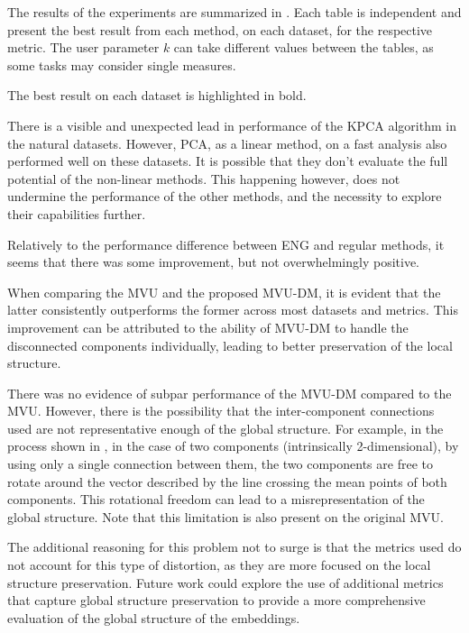         The results of the experiments are summarized in . Each table is independent and present the best result from each method, on each dataset, for the respective metric. The user parameter $k$ can take different values between the tables, as some tasks may consider single measures.
        
        The best result on each dataset is highlighted in bold.

        There is a visible and unexpected lead in performance of the \ac{KPCA} algorithm in the natural datasets. However, \ac{PCA}, as a linear method, on a fast analysis also performed well on these datasets. It is possible that they don't evaluate the full potential of the non-linear methods. This happening however, does not undermine the performance of the other methods, and the necessity to explore their capabilities further.

        Relatively to the performance difference between \ac{ENG} and regular methods, it seems that there was some improvement, but not overwhelmingly positive.

        When comparing the \ac{MVU} and the proposed \ac{MVU-DM}, it is evident that the latter consistently outperforms the former across most datasets and metrics. This improvement can be attributed to the ability of MVU-DM to handle the disconnected components individually, leading to better preservation of the local structure.
        
        There was no evidence of subpar performance of the \ac{MVU-DM} compared to the \ac{MVU}. However, there is the possibility that the inter-component connections used are not representative enough of the global structure. For example, in the process shown in , in the case of two components (intrinsically 2-dimensional), by using only a single connection between them, the two components are free to rotate around the vector described by the line crossing the mean points of both components. This rotational freedom can lead to a misrepresentation of the global structure. Note that this limitation is also present on the original \ac{MVU}.

        The additional reasoning for this problem not to surge is that the metrics used do not account for this type of distortion, as they are more focused on the local structure preservation. Future work could explore the use of additional metrics that capture global structure preservation to provide a more comprehensive evaluation of the global structure of the embeddings.
        

